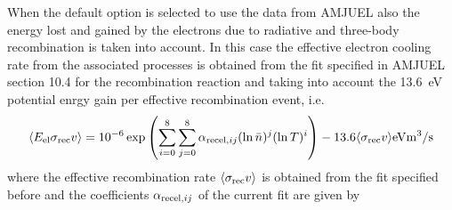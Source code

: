 \documentclass[amsmath,amssymb,a4]{revtex4-2}
\begin{document}
When the default option is selected to use the data from AMJUEL also the energy lost and gained by the electrons due to radiative and three-body recombination is taken into account. In this case the effective electron cooling rate from the associated processes is obtained from the fit specified in AMJUEL section 10.4 for the recombination reaction and taking into account the 13.6~eV potential enrgy gain per effective recombination event, i.e.
\begin{equation}
  \langle E_{\rm el} \sigma_{\rm rec} v\rangle =  10^{-6} \exp\left( \sum_{i=0}^8\sum_{j=0}^8 \alpha_{{\rm rec el,} ij} (\ln \bar n)^j (\ln T)^i \right) - 13.6 \langle\sigma_{\rm rec} v\rangle  {\rm eV} {\rm m}^3/{\rm s}
\end{equation}
where the effective recombination rate $\langle\sigma_{\rm rec} v\rangle$ is obtained from the fit specified before and the coefficients $\alpha_{{\rm rec el,} ij}$ of the current fit are given by
\end{document}
